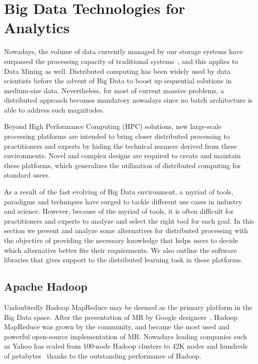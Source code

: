 \documentclass[3p,review]{elsarticle}
\begin{document}
\section{Big Data Technologies for Analytics}\label{sec:techno}


Nowadays, the volume of data currently managed by our storage systems have surpassed the processing capacity of traditional systems~\cite{wu14}, and this applies to Data Mining as well. Distributed computing has been widely used by data scientists before the advent of Big Data to boost up sequential solutions in medium-size data. Nevertheless, for most of current massive problems, a distributed approach becomes mandatory nowadays since no batch architecture is able to address such magnitudes.

Beyond High Performance Computing (HPC) solutions, new large-scale processing platforms are intended to bring closer distributed processing to practitioners and experts by hiding the technical nuances derived from these environments. Novel and complex designs are required to create and maintain these platforms, which generalizes the utilization of distributed computing for standard users. 

As a result of the fast evolving of Big Data environment, a myriad of tools, paradigms and techniques have surged to tackle different use cases in industry and science. However, because of the myriad of tools, it is often difficult for practitioners and experts to analyze and select the right tool for each goal. In this section we present and analyze some alternatives for distributed processing with the objective of providing the necessary knowledge that helps users to decide which alternative better fits their requirements. We also outline the software libraries that gives support to the distributed learning task in these platforms.

\subsection{Apache Hadoop}\label{subsec:hadoop}

Undoubtedly Hadoop MapReduce may be deemed as the primary platform in the Big Data space. After the presentation of MR by Google designers~\cite{dean04}, Hadoop MapReduce was grown by the community, and became the most used and powerful open-source implementation of MR. Nowadays leading companies such as Yahoo has scaled from 100-node Hadoop clusters to 42K nodes and hundreds of petabytes~\cite{harris13} thanks to the outstanding performance of Hadoop. 
\end{document}
